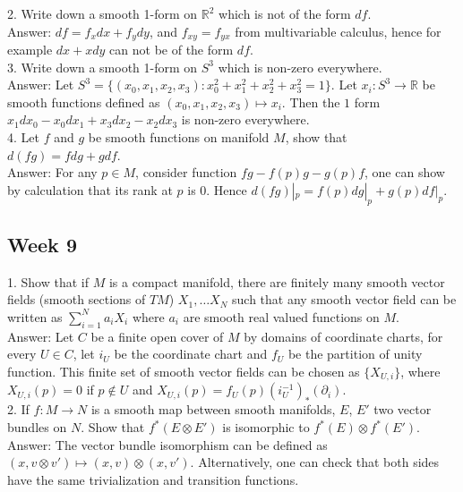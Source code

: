 \documentclass{article}
\theoremstyle{definition}
\begin{document}
2. Write down a smooth 1-form on $\mathbb{R}^2$ which is not of the form $df$.\\

Answer: $df=f_xdx+f_ydy$, and $f_{xy}=f_{yx}$ from multivariable calculus, hence for example $dx+xdy$ can not be of the form $df$.\\

3. Write down a smooth 1-form on $S^3$ which is non-zero everywhere.\\

Answer: Let $S^3=\{(x_0, x_1, x_2, x_3): x_0^2+x_1^2+x_2^2+x_3^2=1\}$. Let $x_i: S^3\rightarrow \mathbb{R}$ be smooth functions defined as $(x_0, x_1, x_2, x_3)\mapsto x_i$. Then the $1$ form $x_1dx_0-x_0dx_1+x_3dx_2-x_2dx_3$ is non-zero everywhere.\\

4. Let $f$ and $g$ be smooth functions on manifold $M$, show that $d(fg)=fdg+gdf$.\\

Answer: For any $p\in M$, consider function $fg-f(p)g-g(p)f$, one can show by calculation that its rank at $p$ is $0$. Hence $d(fg)|_p=f(p)dg|_p+g(p)df|_p$.

\subsection{Week 9}

1. Show that if $M$ is a compact manifold, there are finitely many smooth vector fields (smooth sections of $TM$) $X_1, \dots X_N$ such that any smooth vector field can be written as $\sum_{i=1}^Na_iX_i$ where $a_i$ are smooth real valued functions on $M$.\\

Answer: Let $C$ be a finite open cover of $M$ by domains of coordinate charts, for every $U\in C$, let $i_U$ be the coordinate chart and $f_U$ be the partition of unity function. This finite set of smooth vector fields can be chosen as $\{X_{U, i}\}$, where $X_{U, i}(p)=0$ if $p\not\in U$ and $X_{U, i}(p)=f_U(p)(i_U^{-1})_*(\partial_i)$.\\

2. If $f: M\rightarrow N$ is a smooth map between smooth manifolds, $E$, $E'$ two vector bundles on $N$. Show that $f^*(E\otimes E')$ is isomorphic to $f^*(E)\otimes f^*(E')$.\\

Answer: The vector bundle isomorphism can be defined as $(x, v\otimes v')\mapsto (x, v)\otimes (x, v')$. Alternatively, one can check that both sides have the same trivialization and transition functions.\\
\end{document}
